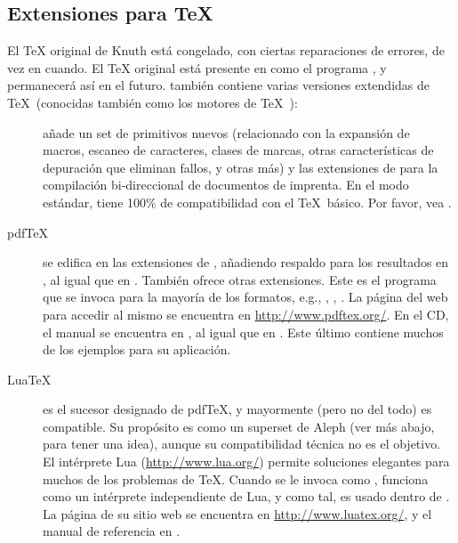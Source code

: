 \documentclass{article}
\begin{document}
\subsection{Extensiones para \protect\TeX}
\label{sec:tex-extensions}

El \TeX{} original de Knuth está congelado, con ciertas reparaciones
de errores, de vez en cuando. El \TeX{} original está presente en \TL{} como el
programa , y permanecerá así en el futuro. \TL{} también contiene
varias versiones extendidas de \TeX\ (conocidas también como los motores de
\TeX\ ):

\begin{description}

\item [\eTeX] añade un set de primitivos nuevos
\label{text:etex} (relacionado con la expansión de macros, escaneo de
caracteres, clases de marcas, otras características de depuración que
eliminan fallos, y otras más) y las extensiones de \TeXXeT{} para la
compilación bi-direccional de documentos de imprenta. En el modo
estándar, \eTeX{} tiene 100\% de compatibilidad con el \TeX\
básico.
Por favor, vea .

\item [pdf\TeX] se edifica en las extensiones de \eTeX{}, añadiendo
	respaldo para los resultados en \acro{PDF}, al igual que en
	\dvi{}. También ofrece otras extensiones. Este es el programa
	que se invoca para la mayoría de los formatos, e.g.,
	, , . La página del web
	para accedir al mismo se encuentra en
	\url{http://www.pdftex.org/}. En el CD, el manual se encuentra
	en , al igual
	que en
	.
	Este último contiene muchos de los ejemplos para su
	aplicación.

\item [Lua\TeX] es el sucesor designado de pdf\TeX, y mayormente (pero
	no del todo) es compatible. Su propósito es como un superset
	de Aleph (ver más abajo, para tener una idea), aunque su
	compatibilidad técnica no es el objetivo. El intérprete Lua
	(\url{http://www.lua.org/}) permite soluciones elegantes para
	muchos de los problemas de \TeX{}. Cuando se le invoca como
	, funciona como un intérprete independiente
	de Lua, y como tal, es usado dentro de \TL{}. La página de su
	sitio web se encuentra en \url{http://www.luatex.org/}, y el
	manual de referencia en
	.


\end{description}
\end{document}
